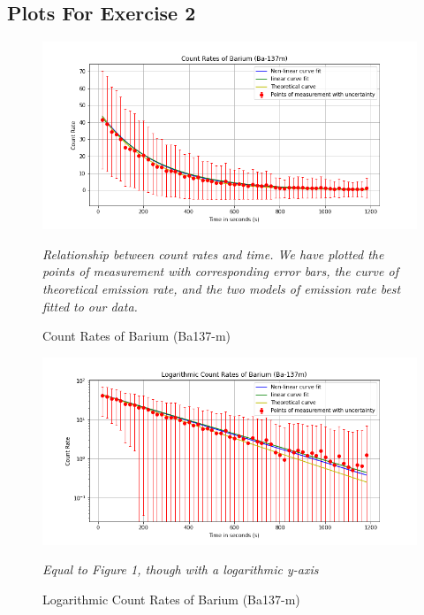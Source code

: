 \documentclass[letterpaper,12pt]{article}
\begin{document}
\subsection{Plots For Exercise 2}
\begin{figure}[H]
  \centering
  \includegraphics[width=0.95\linewidth]{../Exercise2/Fredrik/Count Rates of Barium (Ba-137m).png}    
  \begin{center}
    \emph{
      Relationship between count rates and time. We have plotted the points of measurement 
      with corresponding error bars, the curve of theoretical emission rate, and the two models 
      of emission rate best fitted to our data.}
  \end{center}
  \caption{Count Rates of Barium (Ba137-m)}
  \label{ba-count-rates}
\end{figure}

\begin{figure}[H]
  \centering
  \includegraphics[width=0.95\linewidth]{../Exercise2/Fredrik/Logarithmic Count Rates of Barium (Ba-137m).png}   
  \begin{center}
    \emph{
      Equal to Figure 1, though with a logarithmic y-axis}
  \end{center}
  \caption{Logarithmic Count Rates of Barium (Ba137-m)}
  \label{ba-count-rates-log}
\end{figure}
\end{document}
